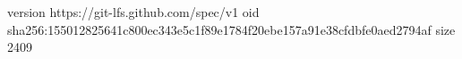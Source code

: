 version https://git-lfs.github.com/spec/v1
oid sha256:155012825641c800ec343e5c1f89e1784f20ebe157a91e38cfdbfe0aed2794af
size 2409
